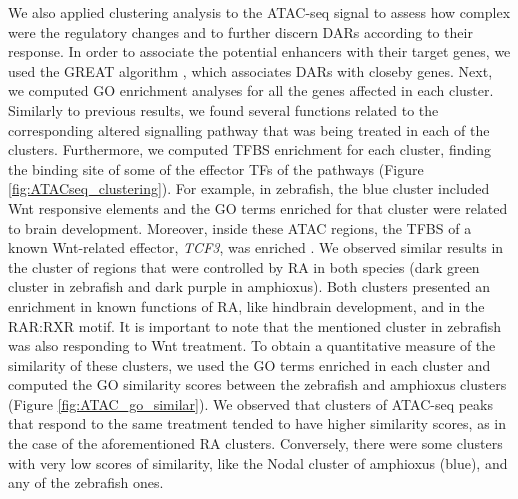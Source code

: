 We also applied clustering analysis to the ATAC-seq signal to assess how complex were the regulatory changes and to further discern DARs according to their response. In order to associate the potential enhancers with their target genes, we used the GREAT algorithm \parencite{mclean_great_2010}, which associates DARs with closeby genes. Next, we computed GO enrichment analyses for all the genes affected in each cluster. Similarly to previous results, we found several functions related to the corresponding altered signalling pathway that was being treated in each of the clusters. Furthermore, we computed TFBS enrichment for each cluster, finding the binding site of some of the effector TFs of the pathways (Figure \ref{fig:ATACseq_clustering}). For example, in zebrafish, the blue cluster included Wnt responsive elements and the GO terms enriched for that cluster were related to brain development. Moreover, inside these ATAC regions, the TFBS of a known Wnt-related effector, \textit{TCF3}, was enriched \parencite{cadigan_tcflefs_2012, kjolby_genome-wide_2017}. We observed similar results in the cluster of regions that were controlled by RA in both species (dark green cluster in zebrafish and dark purple in amphioxus). Both clusters presented an enrichment in known functions of RA, like hindbrain development, and in the RAR:RXR motif. It is important to note that the mentioned cluster in zebrafish was also responding to Wnt treatment. To obtain a quantitative measure of the similarity of these clusters, we used the GO terms enriched in each cluster and computed the GO similarity scores between the zebrafish and amphioxus clusters (Figure \ref{fig:ATAC_go_similar}). We observed that clusters of ATAC-seq peaks that respond to the same treatment tended to have higher similarity scores, as in the case of the aforementioned RA clusters. Conversely, there were some clusters with very low scores of similarity, like the Nodal cluster of amphioxus (blue), and any of the zebrafish ones. 




